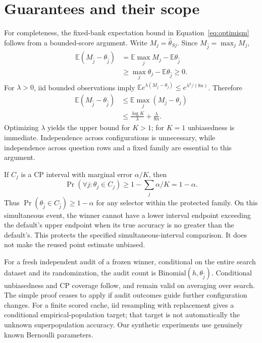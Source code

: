 \section{Guarantees and their scope}
\label{app:guarantees}
For completeness, the fixed-bank expectation bound in Equation~\eqref{eq:optimism} follows from a bounded-score argument. Write $M_j=\hat\theta_{Sj}$. Since $M_{\hat j}=\max_jM_j$,
\begin{align}
\mathbb{E}(M_{\hat j}-\theta_{\hat j})
&=\mathbb{E}\max_jM_j-\mathbb{E}\theta_{\hat j}\\
&\geq\max_j\theta_j-\mathbb{E}\theta_{\hat j}\geq0.
\end{align}
For $\lambda>0$, iid bounded observations imply
$\mathbb{E}e^{\lambda(M_j-\theta_j)}\leq e^{\lambda^2/(8n)}$. Therefore
\begin{align}
\mathbb{E}(M_{\hat j}-\theta_{\hat j})
&\leq\mathbb{E}\max_j(M_j-\theta_j)\\
&\leq\frac{\log K}{\lambda}+\frac{\lambda}{8n}.
\end{align}
Optimizing $\lambda$ yields the upper bound for $K>1$; for $K=1$ unbiasedness is immediate. Independence across configurations is unnecessary, while independence across question rows and a fixed family are essential to this argument.

If $C_j$ is a CP interval with marginal error $\alpha/K$, then
\begin{equation}
\Pr(\forall j:\theta_j\in C_j)\geq1-\sum_j\alpha/K=1-\alpha.
\end{equation}
Thus $\Pr(\theta_{\hat j}\in C_{\hat j})\geq1-\alpha$ for any selector within the protected family. On this simultaneous event, the winner cannot have a lower interval endpoint exceeding the default's upper endpoint when its true accuracy is no greater than the default's. This protects the specified simultaneous-interval comparison. It does not make the reused point estimate unbiased.

For a fresh independent audit of a frozen winner, conditional on the entire search dataset and its randomization, the audit count is $\mathrm{Binomial}(h,\theta_{\hat j})$. Conditional unbiasedness and CP coverage follow, and remain valid on averaging over search. The simple proof ceases to apply if audit outcomes guide further configuration changes. For a finite scored cache, iid resampling with replacement gives a conditional empirical-population target; that target is not automatically the unknown superpopulation accuracy. Our synthetic experiments use genuinely known Bernoulli parameters.

